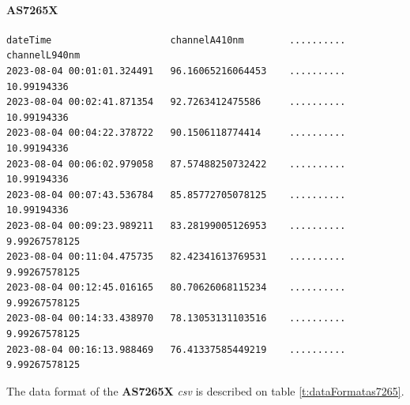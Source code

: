 \documentclass[12pt]{article}
\begin{document}
\paragraph{AS7265X}
\label{sec:as7265DataFormat}
{\begin{verbatim}
dateTime                     channelA410nm        .......... channelL940nm
2023-08-04 00:01:01.324491   96.16065216064453    .......... 10.99194336
2023-08-04 00:02:41.871354   92.7263412475586     .......... 10.99194336
2023-08-04 00:04:22.378722   90.1506118774414     .......... 10.99194336  
2023-08-04 00:06:02.979058   87.57488250732422    .......... 10.99194336   
2023-08-04 00:07:43.536784   85.85772705078125    .......... 10.99194336  
2023-08-04 00:09:23.989211   83.28199005126953    .......... 9.99267578125
2023-08-04 00:11:04.475735   82.42341613769531    .......... 9.99267578125
2023-08-04 00:12:45.016165   80.70626068115234    .......... 9.99267578125
2023-08-04 00:14:33.438970   78.13053131103516    .......... 9.99267578125
2023-08-04 00:16:13.988469   76.41337585449219    .......... 9.99267578125
\end{verbatim}}
         The data format of the \textbf{AS7265X} \emph{csv} is described on table \ref{t:dataFormatas7265}.
        
\end{document}
